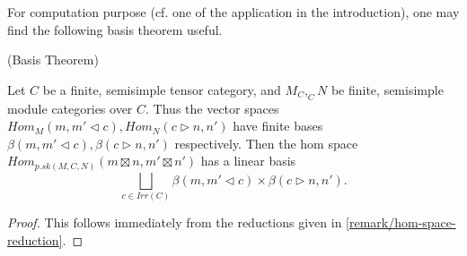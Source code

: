 \noindent For computation purpose (cf. one of the application in the introduction), one
may find the following basis theorem useful.

\begin{proposition} (Basis Theorem) \label{proposition/basis-theorem}

  \noindent Let $C$ be a finite, semisimple tensor category, and
  $M_{C}, _{C}N$ be finite, semisimple module categories over $C$. \quad Thus
  the vector spaces $Hom_{M}(m, m' \lhd c), Hom_{N}(c \rhd n, n')$ have finite bases
  $\beta(m, m' \lhd c), \beta(c \rhd n, n')$ respectively. \quad Then the hom space
  $Hom_{p.sk(M,C,N)}(m \boxtimes n, m' \boxtimes n')$ has a linear basis
  \[
    \bigsqcup_{c \in Irr(C)} \beta(m, m' \lhd c) \times \beta(c \rhd n, n').
  \]
\end{proposition}
\begin{proof}
  This follows immediately from the reductions given in \ref{remark/hom-space-reduction}.
\end{proof}
